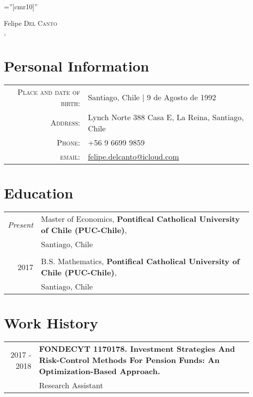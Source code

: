 \documentclass[a4paper,10pt]{article}
\begin{document}
\pagestyle{empty} %

\font\fb=''[cmr10]'' %

\par{\centering
		{{\Huge Felipe \textsc{Del Canto}}	\\
		 {\large \monthname, \the\year }
	}\par}

\section{Personal Information}

\begin{tabular}{rl}
    \textsc{Place and date of birth:}	&	Santiago, Chile  | 9 de Agosto de 1992 \\
    \textsc{Address:}   			&	Lynch Norte 388 Casa E, La Reina, Santiago, Chile \\
    \textsc{Phone:}	   			&	+56 9 6699 9859\\
    \textsc{email:}     				&	\href{mailto:felipe.delcanto@icloud.com}{felipe.delcanto@icloud.com}
\end{tabular}

\section{Education}
\begin{tabular}{rl}
\emph{Present}
	& Master of Economics, \textbf{Pontifical Catholical University of Chile (PUC-Chile)},\\
	& Santiago, Chile\\
	&	\\
	
\textsc{2017}
	& B.S. Mathematics, \textbf{Pontifical Catholical University of Chile (PUC-Chile)},\\
	& Santiago, Chile\\
	
\end{tabular}

\section{Work History}
\begin{tabular}{r|p{11cm}}
\textsc{2017 - 2018}
 	&	\textbf{FONDECYT 1170178. Investment Strategies And Risk-Control Methods For Pension Funds: An Optimization-Based Approach.}	\\
	&	Research Assistant \\
\end{tabular}
\end{document}
